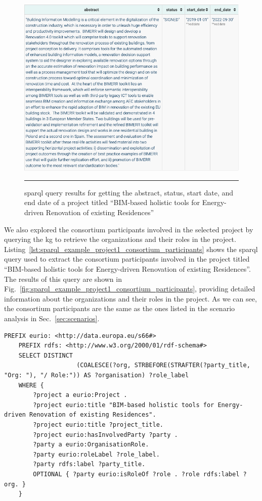 \begin{figure}[htbp]
    \centering
 \includegraphics[width=.8\textwidth]{figures/architecture/sparql_example_project1_data_properties.png}
     \rule{35em}{0.5pt}
    \caption{\gls{sparql} query results for getting the abstract, status, start date, and end date of a project titled ``BIM-based holistic tools for Energy-driven Renovation of existing Residences''}
 \label{fig:sparql_example_project1_data_properties}
\end{figure}

We also explored the consortium participants involved in the selected project by querying the \gls{kg} to retrieve the organizations and their roles in the project.
Listing~\ref{lst:sparql_example_project1_consortium_participants} shows the \gls{sparql} query used to extract the consortium participants involved in the project titled ``BIM-based holistic tools for Energy-driven Renovation of existing Residences''.
The results of this query are shown in Fig.~\ref{fig:sparql_example_project1_consortium_participants}, providing detailed information about the organizations and their roles in the project.
As we can see, the consortium participants are the same as the ones listed in the scenario analysis in Sec.~\ref{sec:scenarios}.

\begin{lstlisting}[language=SPARQL, caption={\gls{sparql} query for getting the consortium participants involved in a project titled ``BIM-based holistic tools for Energy-driven Renovation of existing Residences''}, label=lst:sparql_example_project1_consortium_participants]
    PREFIX eurio: <http://data.europa.eu/s66#>
    PREFIX rdfs: <http://www.w3.org/2000/01/rdf-schema#>
    SELECT DISTINCT  
                    (COALESCE(?org, STRBEFORE(STRAFTER(?party_title, "Org: "), "/ Role:")) AS ?organisation) ?role_label
    WHERE {
        ?project a eurio:Project .
        ?project eurio:title "BIM-based holistic tools for Energy-driven Renovation of existing Residences".
        ?project eurio:title ?project_title.
        ?project eurio:hasInvolvedParty ?party .
        ?party a eurio:OrganisationRole.
        ?party eurio:roleLabel ?role_label.
        ?party rdfs:label ?party_title.
        OPTIONAL { ?party eurio:isRoleOf ?role . ?role rdfs:label ?org. }
    }
\end{lstlisting}

